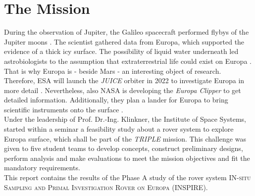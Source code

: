 %
%
%
\chapter{The Mission}
\label{chap:mission}

During the observation  of Jupiter, the Galileo spacecraft performed flybys of the Jupiter moons \cite{Mission_01}.
The scientist gathered data from Europa, which supported the evidence of a thick icy surface.
The possibility of liquid water underneath led astrobiologists to the assumption that extraterrestrial life could exist on Europa \cite{Mission_02}.
That is why Europa is - beside Mars - an interesting object of research.\\

Therefore, ESA will launch the \textit{JUICE} orbiter in 2022 to investigate Europa in more detail \cite{Mission_03}. 
Nevertheless, also NASA is developing the  \textit{Europa Clipper} to get detailed information.
Additionally, they plan a lander for Europa to bring scientific instruments onto the surface \cite{Mission_04, Mission_05}.\\

Under the leadership of  Prof. Dr.-Ing. Klinkner, the Institute of Space Systems, started within a seminar a feasibility study about a rover system to explore Europa surface, which shall  be part of the \textit{TRIPLE} mission.
This challenge was given to five student teams to develop concepts, construct preliminary designs, perform analysis and make evaluations to  meet the mission objectives and fit the mandatory requirements. \\


This report contains the results of the Phase A study of the rover system \textsc{IN-situ Sampling and Primal Investigation Rover on Europa}  (INSPIRE).